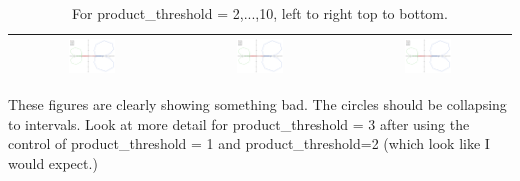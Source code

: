 \documentclass[a4paper,10pt]{article}
\begin{document}
\begin{table}[!ht]
\begin{tabular}{|c|c|c|}
  \includegraphics[width=0.3\textwidth]{product_threshold_test1_threshold-8.png} & 
  \includegraphics[width=0.3\textwidth]{product_threshold_test1_threshold-9.png} &
  \includegraphics[width=0.3\textwidth]{product_threshold_test1_threshold-10.png} \\\hline
 \end{tabular}
 \caption{For product\_threshold = 2,...,10, left to right top to bottom.}
\end{table}
 
 These figures are clearly showing something bad. The circles should be collapsing to intervals. Look at more detail for product\_threshold = 3 after using the control of product\_threshold = 1 and product\_threshold=2 (which look like I would expect.)
 
 
\end{document}
